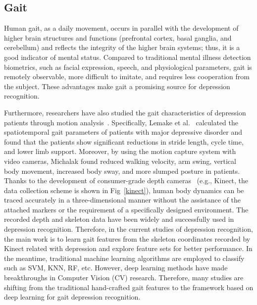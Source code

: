 
\ifx\allfiles\undefined
    
\fi

\subsection{Gait}
Human gait, as a daily movement, occurs in parallel with the development of higher brain structures and functions (prefrontal cortex, basal ganglia, and cerebellum) and reflects the integrity of the higher brain systems\cite{sheridan2007role}; thus, it is a good indicator of mental status.
Compared to traditional mental illness detection biometrics, such as facial expression, speech, and physiological parameters, gait is remotely observable, more difficult to imitate, and requires less cooperation from the subject\cite{xu2020emotion}. These advantages make gait a promising source for depression recognition.

Furthermore, researchers have also studied the gait characteristics of depression patients through motion analysis~\cite{sloman1987mood,brandler2012depressive,van2005quantitative,michalak2011effects,radovanovic2014gait,naidu2019does}.
Specifically, Lemake et al.~\cite{lemke2000spatiotemporal} calculated the spatiotemporal gait parameters of patients with major depressive disorder and found that the patients show significant reductions in stride length, cycle time, and lower limb support.
Moreover, by using the motion capture system with video cameras, Michalak\cite{michalak2009embodiment} found reduced walking velocity, arm swing, vertical body movement, increased body sway, and more slumped posture in patients.
Thanks to the development of consumer-grade depth cameras~\cite{karg2010recognition,venture2014recognizing} (e.g., Kinect\cite{gholami2016microsoft}, the data collection
scheme is shown in Fig~\ref{kinect}), human body dynamics can be traced accurately in a three-dimensional manner without the assistance of the attached markers or the requirement of a specifically designed environment.
The recorded depth and skeleton data have been widely and successfully used in depression recognition.
Therefore, in the current studies of depression recognition, the main work is to learn gait features from the skeleton coordinates recorded by Kinect related with depression and explore feature sets for better performance.
In the meantime, traditional machine learning algorithms are employed to classify such as SVM, KNN, RF, etc.  However, deep learning methods have made breakthroughs in Computer Vision (CV) research. Therefore, many studies are shifting from the traditional hand-crafted gait features to the framework based on deep learning for gait depression recognition.



